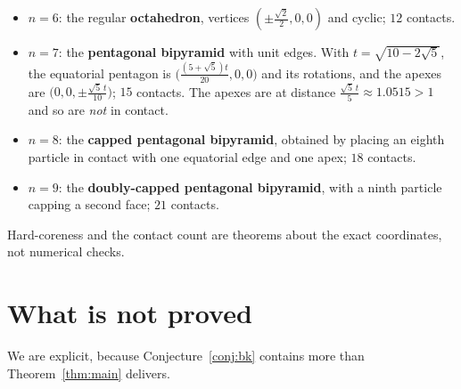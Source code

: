 \documentclass[11pt,a4paper]{article}
\theoremstyle{plain}
\theoremstyle{definition}
\begin{document}
\begin{itemize}[leftmargin=*]
\item $n=6$: the regular \textbf{octahedron}, vertices
  $(\pm\tfrac{\sqrt2}{2},0,0)$ and cyclic; $12$ contacts.
\item $n=7$: the \textbf{pentagonal bipyramid} with unit edges. With
  $t = \sqrt{10 - 2\sqrt5}$, the equatorial pentagon is
  $\bigl(\tfrac{(5+\sqrt5)t}{20},0,0\bigr)$ and its rotations, and the apexes are
  $\bigl(0,0,\pm\tfrac{\sqrt5\,t}{10}\bigr)$; $15$ contacts. The apexes are at
  distance $\tfrac{\sqrt5\,t}{5} \approx 1.0515 > 1$ and so are \emph{not} in contact.
\item $n=8$: the \textbf{capped pentagonal bipyramid}, obtained by placing an eighth
  particle in contact with one equatorial edge and one apex; $18$ contacts.
\item $n=9$: the \textbf{doubly-capped pentagonal bipyramid}, with a ninth particle
  capping a second face; $21$ contacts.
\end{itemize}

Hard-coreness and the contact count are theorems about the exact coordinates, not
numerical checks.

\section{What is not proved}
\label{sec:notproved}

We are explicit, because Conjecture~\ref{conj:bk} contains more than
Theorem~\ref{thm:main} delivers.
\end{document}
